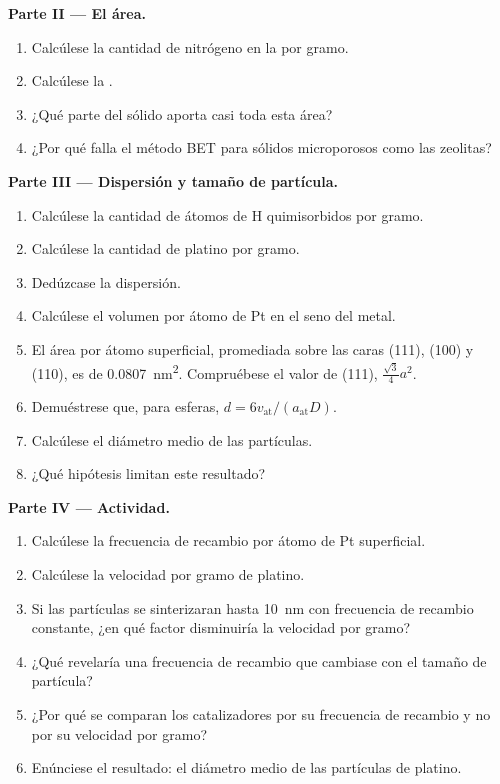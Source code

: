\begin{problem}
\medskip\noindent\textbf{Parte II --- El área.}
\begin{enumerate}[resume]
  \item Calcúlese la cantidad de nitrógeno en la  por gramo.
  \item Calcúlese la .
  \item ¿Qué parte del sólido aporta casi toda esta área?
  \item ¿Por qué falla el método BET para sólidos microporosos como las zeolitas?
\end{enumerate}

\medskip\noindent\textbf{Parte III --- Dispersión y tamaño de partícula.}
\begin{enumerate}[resume]
  \item Calcúlese la cantidad de átomos de H quimisorbidos por gramo.
  \item Calcúlese la cantidad de platino por gramo.
  \item Dedúzcase la dispersión.
  \item Calcúlese el volumen por átomo de Pt en el seno del metal.
  \item El área por átomo superficial, promediada sobre las caras (111), (100) y (110),
        es de \qty{0.0807}{nm^2}. Compruébese el valor de (111), $\frac{\sqrt3}{4}a^2$.
  \item Demuéstrese que, para esferas, $d = 6v_{\mathrm{at}}/(a_{\mathrm{at}}D)$.
  \item Calcúlese el diámetro medio de las partículas.
  \item ¿Qué hipótesis limitan este resultado?
\end{enumerate}

\medskip\noindent\textbf{Parte IV --- Actividad.}
\begin{enumerate}[resume]
  \item Calcúlese la frecuencia de recambio por átomo de Pt superficial.
  \item Calcúlese la velocidad por gramo de platino.
  \item Si las partículas se sinterizaran hasta \qty{10}{nm} con frecuencia de recambio constante, ¿en qué
        factor disminuiría la velocidad por gramo?
  \item ¿Qué revelaría una frecuencia de recambio que cambiase con el tamaño de partícula?
  \item ¿Por qué se comparan los catalizadores por su frecuencia de recambio y no por su velocidad por
        gramo?
  \item Enúnciese el resultado: el diámetro medio de las partículas de platino.
\end{enumerate}
\end{problem}

